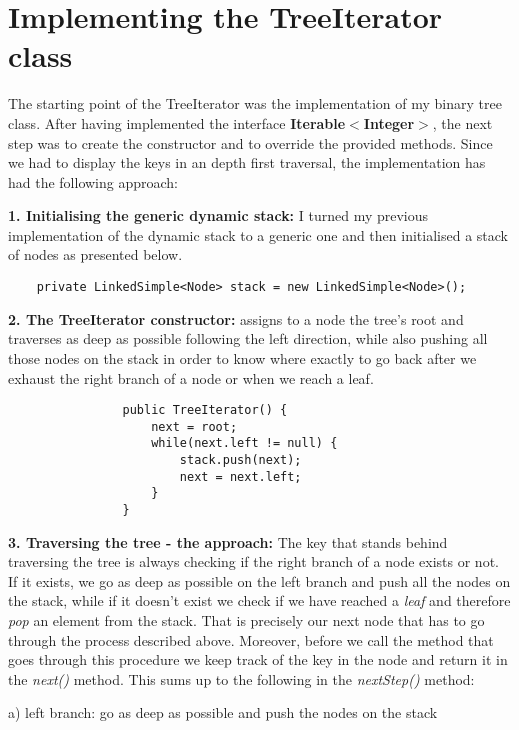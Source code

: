 \documentclass[a4paper,11pt]{article}
\begin{document}
\section*{Implementing the TreeIterator class}

The starting point of the TreeIterator was the implementation of my binary tree class. After having implemented the interface \textbf{Iterable$<$Integer$>$}, the next step was to create the constructor and to override the provided methods. Since we had to display the keys in an depth first traversal, the implementation has had the following approach:\newline

\textbf{1. Initialising the generic dynamic stack:} I turned my previous implementation of the dynamic stack to a generic one and then initialised a stack of nodes as presented below.

\begin{verbatim}
    private LinkedSimple<Node> stack = new LinkedSimple<Node>();
\end{verbatim}


\textbf{2. The TreeIterator constructor:} assigns to a node the tree's root and traverses as deep as possible following the left direction, while also pushing all those nodes on the stack in order to know where exactly to go back after we exhaust the right branch of a node or when we reach a leaf.

\begin{verbatim}
                public TreeIterator() {
                    next = root;
                    while(next.left != null) {
                        stack.push(next);
                        next = next.left;
                    }
                }
\end{verbatim}

\textbf{3. Traversing the tree - the approach:} The key that stands behind traversing the tree is always checking if the right branch of a node exists or not. If it exists, we go as deep as possible on the left branch and push all the nodes on the stack, while if it doesn't exist we check if we have reached a \textit{leaf} and therefore \textit{pop} an element from the stack. That is precisely our next node that has to go through the process described above. Moreover, before we call the method that goes through this procedure we keep track of the key in the node and return it in the \textit{next()} method. This sums up to the following in the \textit{nextStep()} method:

\begin{flushleft}
a) left branch: go as deep as possible and push the nodes on the stack
\end{flushleft}
\end{document}
